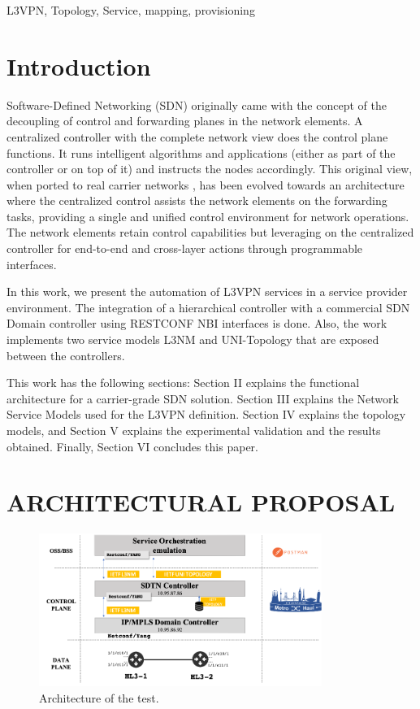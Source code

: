 \documentclass[conference]{IEEEtran}
\begin{document}
\begin{IEEEkeywords}
L3VPN, Topology, Service, mapping, provisioning
\end{IEEEkeywords}

\section{Introduction}
Software-Defined Networking (SDN) originally \cite{b1} came with the concept of the decoupling of control and forwarding planes in the network elements.
A centralized controller with the complete network view does the control plane functions. 
It runs intelligent algorithms and applications (either as part of the controller or on top of it) and instructs the nodes accordingly. 
This original view, when ported to real carrier networks \cite{b2}, has been evolved towards an architecture where the centralized control assists the network elements on the forwarding tasks, providing a single and unified control environment for network operations. 
The network elements retain control capabilities but leveraging on the centralized controller for end-to-end and cross-layer actions through programmable interfaces. 

In this work, we present the automation of L3VPN services in a service provider environment. 
The integration of a hierarchical controller with a commercial SDN Domain controller using RESTCONF NBI interfaces is done.
Also, the work implements two service models L3NM \cite{b3} and UNI-Topology \cite{b4} that are exposed between the controllers. 

This work has the following sections: Section II explains the functional architecture for a carrier-grade SDN solution. Section III explains the Network Service Models used for the L3VPN definition. Section IV explains the topology models, and Section V explains the experimental validation and the results obtained. Finally, Section VI concludes this paper.

\section{ARCHITECTURAL PROPOSAL}

\begin{figure}[tb]
\centerline{\includegraphics[width=9.2cm,angle=0]{ARCHITCTURE.png}}
\caption{Architecture of the test.}
\label{fig1}
\end{figure}
\end{document}
